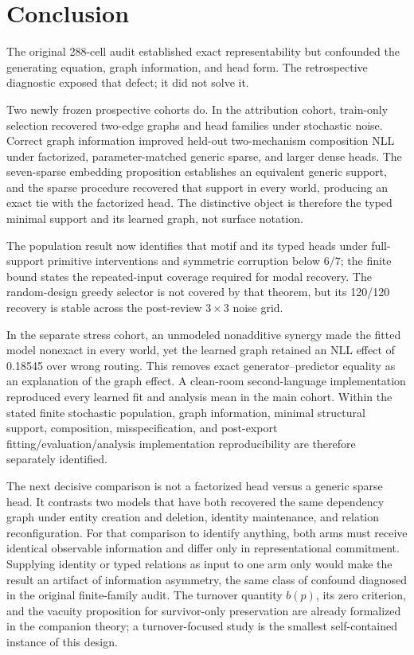 \section{Conclusion}

The original 288-cell audit established exact representability but confounded
the generating equation, graph information, and head form.  The retrospective
diagnostic exposed that defect; it did not solve it.

Two newly frozen prospective cohorts do.  In the attribution cohort, train-only
selection recovered two-edge graphs and head families under stochastic noise.
Correct graph information improved held-out two-mechanism composition NLL under
factorized, parameter-matched generic sparse, and larger dense heads.  The
seven-sparse embedding proposition establishes an equivalent generic support,
and the sparse procedure recovered that support in every world, producing an
exact tie with the factorized head.  The distinctive object is therefore the
typed minimal support and its learned graph, not surface notation.

The population result now identifies that motif and its typed heads under
full-support primitive interventions and symmetric corruption below \(6/7\);
the finite bound states the repeated-input coverage required for modal recovery.
The random-design greedy selector is not covered by that theorem, but its
120/120 recovery is stable across the post-review \(3\times3\) noise grid.

In the separate stress cohort, an unmodeled nonadditive synergy made the fitted
model nonexact in every world, yet the learned graph retained an NLL effect of
0.18545 over wrong routing.  This removes exact generator--predictor equality as
an explanation of the graph effect.  A clean-room second-language
implementation reproduced every learned fit and analysis mean in the main
cohort.  Within the stated finite stochastic population, graph information,
minimal structural support, composition, misspecification, and post-export
fitting/evaluation/analysis implementation reproducibility are therefore
separately identified.

The next decisive comparison is not a factorized head versus a generic sparse
head. It contrasts two models that have both recovered the same dependency
graph under entity creation and deletion, identity maintenance, and relation
reconfiguration. For that comparison to identify anything, both arms must
receive identical observable information and differ only in representational
commitment. Supplying identity or typed relations as input to one arm only
would make the result an artifact of information asymmetry, the same class of
confound diagnosed in the original finite-family audit. The turnover quantity
\(b(p)\), its zero criterion, and the vacuity proposition for survivor-only
preservation are already formalized in the companion theory; a turnover-focused
study is the smallest self-contained instance of this design.
